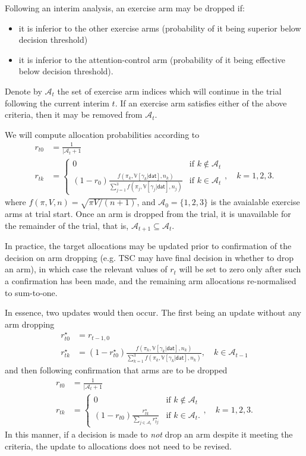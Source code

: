 \documentclass[
]{article}
\providecommand{\tightlist}{%
  \setlength{\itemsep}{0pt}\setlength{\parskip}{0pt}}
\begin{document}
Following an interim analysis, an exercise arm may be dropped if:
\begin{itemize}\tightlist
  \item it is inferior to the other exercise arms (probability of it being superior below decision threshold)
  \item it is inferior to the attention-control arm (probability of it being effective below decision threshold).
\end{itemize}

Denote by $\mathcal{A}_t$ the set of exercise arm indices which will continue in the trial following the current interim $t$.
If an exercise arm satisfies either of the above criteria, then it may be removed from $\mathcal{A}_t$.

We will compute allocation probabilities according to
$$
\begin{aligned}
r_{t0} &= \frac{1}{|\mathcal{A}_t + 1} \\
r_{tk} &= \begin{cases}
  0 & \text{if } k \notin \mathcal{A}_t \\
  (1 - r_0) \frac{f(\pi_k, \mathbb V[\gamma_k|\mathsf{dat}], n_k)}{\sum_{j=1}^3 f(\pi_j, \mathbb V[\gamma_j|\mathsf{dat}], n_j)} & \text{if }k\in\mathcal{A}_t
\end{cases}, \quad k=1,2,3.
\end{aligned}
$$
where $f(\pi, V, n) = \sqrt{\pi V/(n + 1)}$, and $\mathcal{A}_0 = \{1,2,3\}$ is the avaialable exercise arms at trial start.
Once an arm is dropped from the trial, it is unavailable for the remainder of the trial, that is, $\mathcal{A}_{t+1} \subseteq \mathcal{A}_t$.

In practice, the target allocations may be updated prior to confirmation of the decision on arm dropping (e.g. TSC may have final decision in whether to drop an arm), in which case the relevant values of $r_t$ 
will be set to zero only after such a confirmation has been made, and the remaining arm allocations re-normalised to sum-to-one.

In essence, two updates would then occur.
The first being an update without any arm dropping
$$
\begin{aligned}
  r_{t0}^\star &= r_{t-1,0} \\
  r_{tk}^\star &= (1 - r_{t0}^\star)\frac{f(\pi_k, \mathbb V[\gamma_k|\mathsf{dat}], n_k)}{\sum_{k=1}^3 f(\pi_k, \mathbb V[\gamma_k|\mathsf{dat}], n_k)}, \quad k\in\mathcal{A}_{t-1}
\end{aligned}
$$
and then following confirmation that arms are to be dropped
$$
\begin{aligned}
  r_{t0} &= \frac{1}{|\mathcal{A}_t + 1} \\
  r_{tk} &= \begin{cases}
    0 & \text{if } k \notin \mathcal{A}_t \\
    (1 - r_{t0}) \frac{r_{tk}^\star}{\sum_{j\in\mathcal{A}_t} r_{tj}^\star} & \text{if } k \in \mathcal{A}_t.
  \end{cases}, \quad k=1,2,3.
\end{aligned}
$$
In this manner, if a decision is made to \emph{not} drop an arm despite it meeting the criteria, the update to allocations does not need to be revised.
\end{document}
